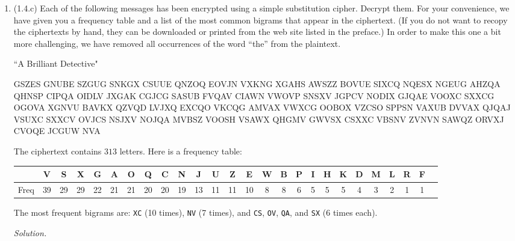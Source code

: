 \documentclass[12pt]{amsart}
\theoremstyle{definition}
\begin{document}
\begin{enumerate}
\bigskip

\item (1.4.c) Each of the following messages has been encrypted using a simple
	substitution cipher. Decrypt them. For your convenience, we have given
	you a frequency table and a list of the most common bigrams that appear
	in the ciphertext. (If you do not want to recopy the ciphertexts by
	hand, they can be downloaded or printed from the web site listed in the
	preface.) In order to make this one a bit more challenging, we have
	removed all occurrences of the word “the” from the plaintext. 

	``A Brilliant Detective"
	\begin{center}
		\ttfamily
		GSZES GNUBE SZGUG SNKGX CSUUE QNZOQ EOVJN VXKNG XGAHS AWSZZ
		BOVUE SIXCQ NQESX NGEUG AHZQA QHNSP CIPQA OIDLV JXGAK CGJCG
		SASUB FVQAV CIAWN VWOVP SNSXV JGPCV NODIX GJQAE VOOXC SXXCG
		OGOVA XGNVU BAVKX QZVQD LVJXQ EXCQO VKCQG AMVAX VWXCG OOBOX
		VZCSO SPPSN VAXUB DVVAX QJQAJ VSUXC SXXCV OVJCS NSJXV NOJQA
		MVBSZ VOOSH VSAWX QHGMV GWVSX CSXXC VBSNV ZVNVN SAWQZ ORVXJ
		CVOQE JCGUW NVA
	\end{center}
		
	The ciphertext contains $313$ letters. Here is a frequency table: 
	\begin{center}
		\ttfamily
		\begin{tabular}{|c||c |c |c |c |c |c |c |c |c |c |c |c |c |c |c |c |c |c |c |c |c |c |c| c| c|}
			\hline
			& V & S & X & G & A & O & Q & C & N & J & U & Z & E & W
			& B & P & I & H & K & D & M & L & R & F \\
			\hline
			Freq  & 39 & 29 & 29 & 22 & 21 & 21 & 20 & 20 & 19 & 13
			      & 11 & 11 & 10 & 8 & 8 & 6 & 5 & 5 & 5 & 4 & 3 &
			2 & 1 & 1 \\
			\hline
		\end{tabular}
	\end{center}

	The most frequent bigrams are: \texttt{XC} (10 times), \texttt{NV} (7
	times), and \texttt{CS}, \texttt{OV}, \texttt{QA}, and \texttt{SX} (6
	times each).

	\medskip
	\textit{Solution.}
	


\end{enumerate}
\end{document}
